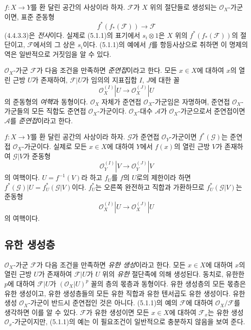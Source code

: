 \begin{env}[5.1.2]
\label{0.5.1.2-ko}
$f:X\to Y$를 환 달린 공간의 사상이라 하자. $\mathcal F$가 $X$ 위의
절단들로 생성되는 $\mathcal O_X$-가군이면, 표준 준동형
\[
  f^*(f_*(\mathcal F))\longrightarrow\mathcal F
\]
(4.4.3.3)은 \emph{전사}이다. 실제로 (5.1.1)의 표기에서
$s_i\otimes1$은 $X$ 위의 $f^*(f_*(\mathcal F))$의 절단이고,
$\mathcal F$에서의 그 상은 $s_i$이다. (5.1.1)의 예에서 $f$를
항등사상으로 취하면 이 명제의 역은 일반적으로 거짓임을 알 수 있다.
\end{env}

\begin{env}[5.1.3]
\label{0.5.1.3-ko}
$\mathcal O_X$-가군 $\mathcal F$가 다음 조건을 만족하면
\emph{준연접}이라고 한다. 모든 $x\in X$에 대하여 $x$의 열린 근방
$U$가 존재하여, $\mathcal F|U$가 임의의 지표집합 $I$, $J$에 대한
꼴
\[
  \mathcal O_X^{(I)}|U\longrightarrow\mathcal O_X^{(J)}|U
\]
의 준동형의 \emph{여핵}과 동형이다. $\mathcal O_X$ 자체가 준연접
$\mathcal O_X$-가군임은 자명하며, 준연접 $\mathcal O_X$-가군들의
모든 직합도 준연접 $\mathcal O_X$-가군이다. $\mathcal O_X$-대수
$\mathcal A$가 $\mathcal O_X$-가군으로서 준연접이면
$\mathcal A$를 \emph{준연접}이라고 한다.
\end{env}

\begin{env}[5.1.4]
\label{0.5.1.4-ko}
$f:X\to Y$를 환 달린 공간의 사상이라 하자. $\mathcal G$가 준연접
$\mathcal O_Y$-가군이면 $f^*(\mathcal G)$는 준연접
$\mathcal O_X$-가군이다. 실제로 모든 $x\in X$에 대하여 $Y$에서
$f(x)$의 열린 근방 $V$가 존재하여 $\mathcal G|V$가 준동형
\[
  \mathcal O_Y^{(I)}|V\longrightarrow\mathcal O_Y^{(J)}|V
\]
의 여핵이다. $U=f^{-1}(V)$라 하고 $f_U$를 $f$의 $U$로의 제한이라
하면 $f^*(\mathcal G)|U=f_U^*(\mathcal G|V)$이다. $f_U^*$는 오른쪽
완전하고 직합과 가환하므로 $f_U^*(\mathcal G|V)$는 준동형
\[
  \mathcal O_X^{(I)}|U\longrightarrow\mathcal O_X^{(J)}|U
\]
의 여핵이다.
\end{env}

\subsection{유한 생성층}
\label{subsection:0.5.2-ko}

\begin{env}[5.2.1]
\label{0.5.2.1-ko}
$\mathcal O_X$-가군 $\mathcal F$가 다음 조건을 만족하면
\emph{유한 생성}이라고 한다. 모든 $x\in X$에 대하여 $x$의 열린
근방 $U$가 존재하여 $\mathcal F|U$가 $U$ 위의 \emph{유한} 절단족에
의해 생성된다. 동치로, 유한한 $p$에 대하여 $\mathcal F|U$가
$(\mathcal O_X|U)^p$ 꼴의 층의 몫층과 동형이다. 유한 생성층의 모든
몫층은 유한 생성이고, 유한 생성층들의 모든 유한 직합과 유한
텐서곱도 유한 생성이다. 유한 생성 $\mathcal O_X$-가군이 반드시
준연접인 것은 아니다. (5.1.1)의 예의 $\mathcal F$에 대하여
$\mathcal O_X/\mathcal F$를 생각하면 이를 알 수 있다.
$\mathcal F$가 유한 생성이면 모든 $x\in X$에 대하여
$\mathcal F_x$는 유한 생성 $\mathcal O_x$-가군이지만, (5.1.1)의 예는
이 필요조건이 일반적으로 충분하지 않음을 보여 준다.
\end{env}

